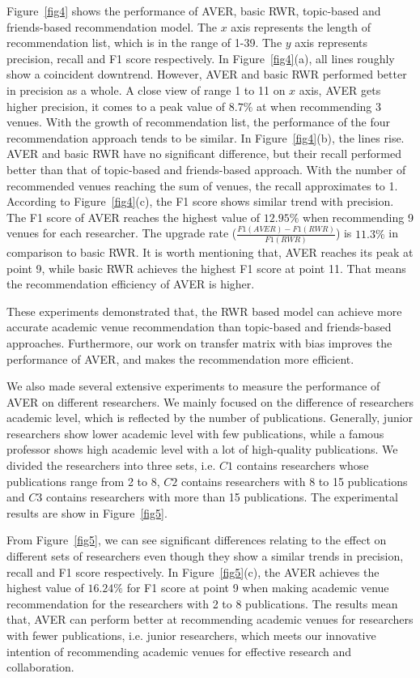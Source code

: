 \documentclass{sig-alternate-2013}
\begin{document}
Figure~\ref{fig4} shows the performance of AVER, basic RWR, topic-based and friends-based recommendation model. The $x$ axis represents the length of recommendation list, which is in the range of 1-39. The $y$ axis represents precision, recall and F1 score respectively. In Figure~\ref{fig4}(a), all lines roughly show a coincident downtrend. However, AVER and basic RWR performed better in precision as a whole. A close view of range 1 to 11 on $x$ axis, AVER gets higher precision, it comes to a peak value of $8.7\%$ at when recommending 3 venues. With the growth of recommendation list, the performance of the four recommendation approach tends to be similar. In Figure~\ref{fig4}(b), the lines rise. AVER and basic RWR have no significant difference, but their recall performed better than that of topic-based and friends-based approach. With the number of recommended venues reaching the sum of venues, the recall approximates to 1. According to Figure~\ref{fig4}(c), the F1 score shows similar trend with precision. The F1 score of AVER reaches the highest value of $12.95\%$ when recommending 9 venues for each researcher. The upgrade rate ($\frac{F1(AVER)-F1(RWR)}{F1(RWR)}$) is $11.3\%$ in comparison to basic RWR. It is worth mentioning that, AVER reaches its peak at point 9, while basic RWR achieves the highest F1 score at point 11. That means the recommendation efficiency of AVER is higher.

These experiments demonstrated that, the RWR based model can achieve more accurate academic venue recommendation than topic-based and friends-based approaches. Furthermore, our work on transfer matrix with bias improves the performance of AVER, and makes the recommendation more efficient.

We also made several extensive experiments to measure the performance of AVER on different researchers. We mainly focused on the difference of researchers academic level, which is reflected by the number of publications. Generally, junior researchers show lower academic level with few publications, while a famous professor shows high academic level with a lot of high-quality publications. We divided the researchers into three sets, i.e. $C1$ contains researchers whose publications range from 2 to 8, $C2$ contains researchers with 8 to 15 publications and $C3$ contains researchers with more than 15 publications. The experimental results are show in Figure~\ref{fig5}.

From Figure~\ref{fig5}, we can see significant differences relating to the effect on different sets of researchers even though they show a similar trends in precision, recall and F1 score respectively. In Figure~\ref{fig5}(c), the AVER achieves the  highest value of $16.24\%$ for F1 score at point 9 when making academic venue recommendation for the researchers with 2 to 8 publications. The results mean that, AVER can perform better at recommending academic venues for researchers with fewer publications, i.e. junior researchers, which meets our innovative intention of recommending academic venues for effective research and collaboration.
\end{document}
